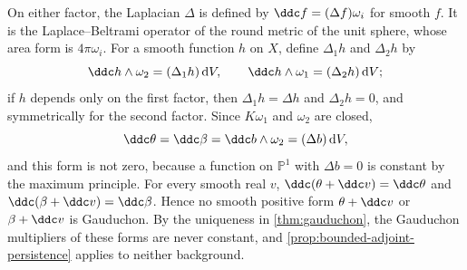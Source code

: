On either factor, the Laplacian $\Delta$ is defined by $\ddc f=(\Delta f)\omega_i$ for smooth $f$. It is the Laplace--Beltrami operator of the round metric of the unit sphere, whose area form is $4\pi\omega_i$. For a smooth function $h$ on $X$, define $\Delta_1h$ and $\Delta_2h$ by
\[
 \ddc h\wedge\omega_2=(\Delta_1h)\,\mathrm dV,\qquad
 \ddc h\wedge\omega_1=(\Delta_2h)\,\mathrm dV;
\]
if $h$ depends only on the first factor, then $\Delta_1h=\Delta h$ and $\Delta_2h=0$, and symmetrically for the second factor. Since $K\omega_1$ and $\omega_2$ are closed,
\[
 \ddc\theta=\ddc\beta=\ddc b\wedge\omega_2=(\Delta b)\,\mathrm dV,
\]
and this form is not zero, because a function on $\mathbb P^1$ with $\Delta b=0$ is constant by the maximum principle. For every smooth real $v$, $\ddc(\theta+\ddc v)=\ddc\theta$ and $\ddc(\beta+\ddc v)=\ddc\beta$. Hence no smooth positive form $\theta+\ddc v$ or $\beta+\ddc v$ is Gauduchon. By the uniqueness in \cref{thm:gauduchon}, the Gauduchon multipliers of these forms are never constant, and \cref{prop:bounded-adjoint-persistence} applies to neither background.

